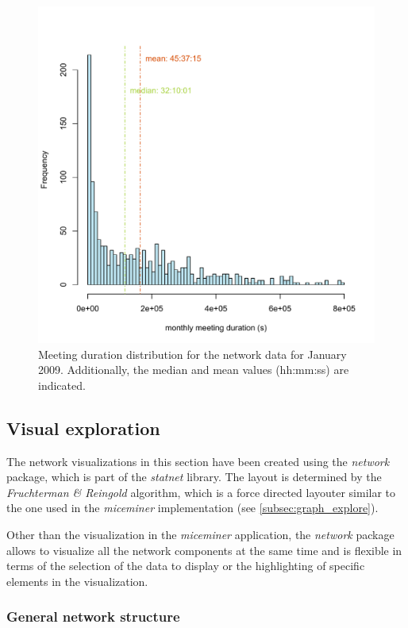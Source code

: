 \begin{figure}[htpb]
\begin{center}
  \includegraphics[width=.75\textwidth]{assets/pdf/meeting_frequency_january.pdf}
  \caption[Histogram of monthly meeting duration]{Meeting duration distribution for the network data for January 2009. Additionally, the median and mean values (hh:mm:ss) are indicated.}
  \label{fig:meeting_frequency_januray}
\end{center}
\end{figure}   

\subsection{Visual exploration}
\label{subsec:visual_exploration}

The network visualizations in this section have been created using the \textit{network}\cite{network:08} package, which is part of the \textit{statnet}\cite{statnet:03} library. The layout is determined by the \textit{Fruchterman \& Reingold}\cite{fruchterman:91} algorithm, which is a force directed layouter similar to the one used in the \textit{miceminer} implementation (see \ref{subsec:graph_explore}).

Other than the visualization in the \textit{miceminer} application, the \textit{network} package allows to visualize all the network components at the same time and is flexible in terms of the selection of the data to display or the highlighting of specific elements in the visualization.

\subsubsection{General network structure}
\label{subsubsec:vis_general}    

